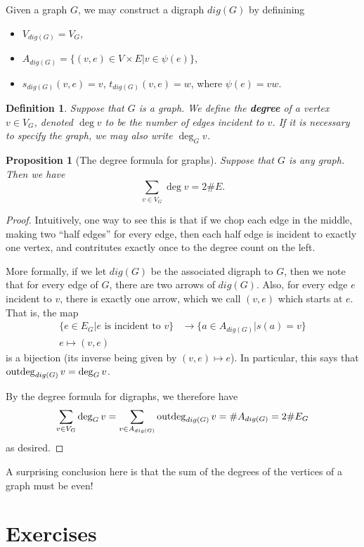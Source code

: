 \documentclass[12pt]{report}
\theoremstyle{plain}
\newtheorem{defn}[thm]{Definition}
\newtheorem{prop}[thm]{Proposition}
\newcommand{\Xb}[1]{\textbf{#1}\index{#1}}
\begin{document}
Given a graph $G$, we may construct a digraph $dig(G)$ by definining
\begin{itemize}
\item $V_{dig(G)} = V_G$,
\item $A_{dig(G)} = \{(v, e) \in V \times E | v \in \psi(e)\}$,
\item $s_{dig(G)}(v, e) = v$, $t_{dig(G)}(v, e) = w$, where $\psi(e) = vw$.
\end{itemize}

\begin{defn}
Suppose that $G$ is a graph. We define the \Xb{degree} of a vertex $v \in
V_G$, denoted $\deg v$ to be the number of edges incident to $v$. If it is
necessary to specify the graph, we may also write $\deg_G v$.
\end{defn}

\begin{prop}[The degree formula for graphs]\label{degree formula}
Suppose that $G$ is any graph. Then we have
\[\sum_{v \in V_G} \deg v = 2\#E.\]
\end{prop}
\begin{proof}
Intuitively, one way to see this is that if we chop each edge in the
middle, making two ``half edges'' for every edge, then each half edge is
incident to exactly one vertex, and contritutes exactly once to the degree
count on the left.

More formally, if we let $dig(G)$ be the associated digraph to $G$, then we
note that for every edge of $G$, there are two arrows of $dig(G)$. Also,
for every edge $e$ incident to $v$, there is exactly one arrow, which we
call $(v, e)$ which starts at $e$. That is, the map
\begin{align*}
\{e \in E_G | \text{$e$ is incident to $v$}\} &\to \{a \in A_{dig(G)} | s(a)
= v\} \\
e \mapsto (v, e) 
\end{align*}
is a bijection (its inverse being given by $(v, e) \mapsto e$). In
particular, this says that $\operatorname{outdeg}_{dig(G)} v = \deg_G v$.

By the
degree formula for digraphs, we therefore have
\[\sum_{v \in V_G} \deg_G v = \sum_{v \in A_{dig(G)}} \operatorname{outdeg}_{dig(G)} v =
\#A_{dig(G)} = 2\#E_G\]
as desired.
\end{proof}

A surprising conclusion here is that the sum of the degrees of the vertices
of a graph must be even! 

\section{Exercises}
\end{document}

